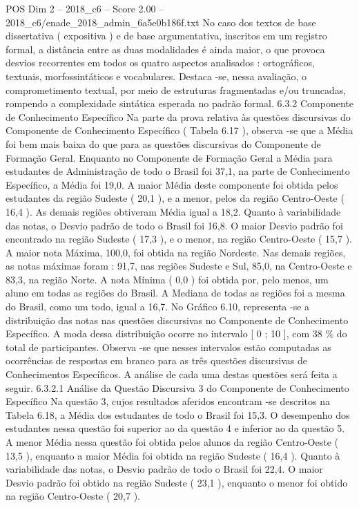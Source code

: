 \begin{textsample}{POS Dim 2 – 2018\_c6 – Score 2.00 – 2018\_c6/enade\_2018\_admin\_6a5e0b186f.txt}
No caso dos textos de base dissertativa ( expositiva ) e de base argumentativa, inscritos em um registro formal, a distância entre as duas modalidades é ainda maior, o que provoca desvios recorrentes em todos os quatro aspectos analisados : ortográficos, textuais, morfossintáticos e vocabulares.
Destaca -se, nessa avaliação, o comprometimento textual, por meio de estruturas fragmentadas e/ou truncadas, rompendo a complexidade sintática esperada no padrão formal. 6.3.2 Componente de Conhecimento Específico Na parte da prova relativa às questões discursivas do Componente de Conhecimento Específico ( Tabela 6.17 ), observa -se que a Média foi bem mais baixa do que para as questões discursivas do Componente de Formação Geral.
Enquanto no Componente de Formação Geral a Média para estudantes de Administração de todo o Brasil foi 37,1, na parte de Conhecimento Específico, a Média foi 19,0.
A maior Média deste componente foi obtida pelos estudantes da região Sudeste ( 20,1 ), e a menor, pelos da região Centro-Oeste ( 16,4 ).
As demais regiões obtiveram Média igual a 18,2.
Quanto à variabilidade das notas, o Desvio padrão de todo o Brasil foi 16,8.
O maior Desvio padrão foi encontrado na região Sudeste ( 17,3 ), e o menor, na região Centro-Oeste ( 15,7 ).
A maior nota Máxima, 100,0, foi obtida na região Nordeste.
Nas demais regiões, as notas máximas foram : 91,7, nas regiões Sudeste e Sul, 85,0, na Centro-Oeste e 83,3, na região Norte.
A nota Mínima ( 0,0 ) foi obtida por, pelo menos, um aluno em todas as regiões do Brasil.
A Mediana de todas as regiões foi a mesma do Brasil, como um todo, igual a 16,7.
No Gráfico 6.10, representa -se a distribuição das notas nas questões discursivas no Componente de Conhecimento Específico.
A moda dessa distribuição ocorre no intervalo [ 0 ; 10 ], com 38 \% do total de participantes.
Observa -se que nesses intervalos estão computadas as ocorrências de respostas em branco para as três questões discursivas de Conhecimentos Específicos.
A análise de cada uma destas questões será feita a seguir. 6.3.2.1 Análise da Questão Discursiva 3 do Componente de Conhecimento Específico Na questão 3, cujos resultados aferidos encontram -se descritos na Tabela 6.18, a Média dos estudantes de todo o Brasil foi 15,3.
O desempenho dos estudantes nessa questão foi superior ao da questão 4 e inferior ao da questão 5.
A menor Média nessa questão foi obtida pelos alunos da região Centro-Oeste ( 13,5 ), enquanto a maior Média foi obtida na região Sudeste ( 16,4 ).
Quanto à variabilidade das notas, o Desvio padrão de todo o Brasil foi 22,4.
O maior Desvio padrão foi obtido na região Sudeste ( 23,1 ), enquanto o menor foi obtido na região Centro-Oeste ( 20,7 ).

\end{textsample}
